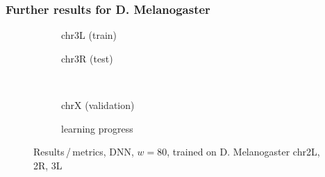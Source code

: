 \subsubsection{Further results for D. Melanogaster} \label{sec:appendix:cgan_drosophila}
\begin{figure}[h!] %
    \begin{subfigure}{0.45\textwidth}
        \scriptsize
        \caption{chr3L (train)}
    \end{subfigure} \hfill
    \begin{subfigure}{0.45\textwidth}
        \scriptsize
        \caption{chr3R (test)}
    \end{subfigure}\\[5mm]
    \begin{subfigure}{0.45\textwidth}
        \scriptsize
        \caption{chrX (validation)}
    \end{subfigure}\hfill
    \begin{subfigure}{0.45\textwidth}
        \scriptsize
        \caption{learning progress} \label{fig:appendix:DNN_drosophila_progress}
    \end{subfigure}
    \caption{Results\,/\,metrics, DNN, $w=80$, trained on D. Melanogaster chr2L, 2R, 3L}   \label{fig:appendix:DNN_drosophila_pearson}
\end{figure}

